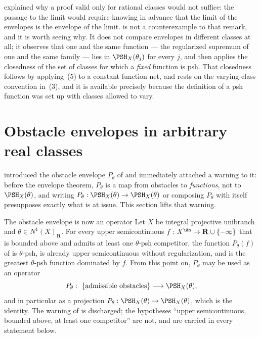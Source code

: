 \begin{remark}
\label{rem:ch45-real-again}
 explained why a proof valid only for rational
classes would not suffice: the passage to the limit would require knowing in
advance that the limit of the envelopes is the envelope of the limit.
 is not a counterexample to that
remark, and it is worth seeing why.  It does not compare envelopes in
different classes at all; it observes that one and the same function ---
the regularized supremum of one and the same family --- lies in
$\PSH_X(\theta_j)$ for every $j$, and then applies the closedness of the
set of classes for which a \emph{fixed} function is psh.  That closedness follows by applying
\,(5) to a constant function net, and rests on the
varying-class convention in \,(3), and it is available
precisely because the definition of a psh function was set up with classes
allowed to vary.
\end{remark}

\section{Obstacle envelopes in arbitrary real classes}
\label{sec:ch45-obstacles}

 introduced the obstacle envelope
$P_\theta$ of  and immediately attached a
warning to it: before the envelope theorem, $P_\theta$ is a map from
obstacles to \emph{functions}, not to $\PSH_X(\theta)$, and writing
$P_\theta:\PSH_X(\theta)\to\PSH_X(\theta)$ or composing $P_\theta$ with
itself presupposes exactly what is at issue.  This section lifts that
warning.

\begin{important}{The obstacle envelope is now an operator}
\label{imp:ch45-obstacle-operator}
Let $X$ be integral projective unibranch and
$\theta\in N^1(X)_{\mathbf R}$.  For every upper semicontinuous
$f:X^{\An}\to\mathbf R\cup\{-\infty\}$ that is bounded above and admits at
least one $\theta$-psh competitor, the function $P_\theta(f)$ of
 is $\theta$-psh, is already upper
semicontinuous without regularization, and is the greatest $\theta$-psh
function dominated by $f$.  From this point on, $P_\theta$ may be used as
an operator
\[
 P_\theta:\ \{\text{admissible obstacles}\}\longrightarrow\PSH_X(\theta),
\]
and in particular as a projection $P_\theta:\PSH_X(\theta)\to\PSH_X(\theta)$,
which is the identity.  The warning of  is
discharged; the hypotheses ``upper semicontinuous, bounded above, at least
one competitor'' are not, and are carried in every statement below.
\end{important}

